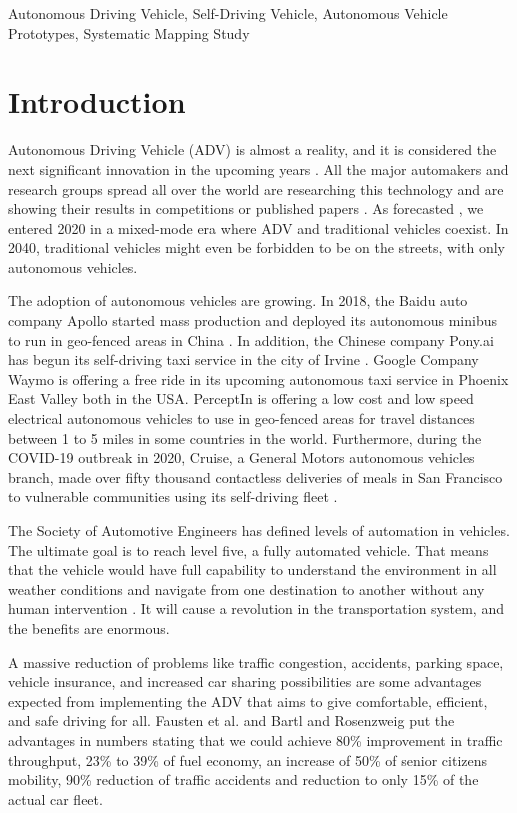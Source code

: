 \documentclass[lettersize,journal]{IEEEtran}
\begin{document}
\begin{IEEEkeywords}
Autonomous Driving Vehicle, Self-Driving Vehicle, Autonomous Vehicle Prototypes, Systematic Mapping Study
\end{IEEEkeywords}

\section{Introduction}
 Autonomous Driving  Vehicle (ADV) is almost a reality, and it is considered the next significant innovation in the upcoming years \cite{Rosenzweig2015}. All the major automakers and research groups spread all over the world are researching this technology and are showing their results in competitions or published papers \cite{Rosenzweig2015,Behere2015,Kato2015,Broggi2015}. As forecasted \cite{Liu2017c}, we entered 2020 in a mixed-mode era where ADV and traditional vehicles coexist. In 2040, traditional vehicles might even be forbidden to be on the streets, with only autonomous vehicles.

The adoption of autonomous vehicles are growing. In 2018, the Baidu auto company Apollo started mass production and deployed its autonomous minibus to run in geo-fenced areas in China \cite{Apollo}. In addition, the Chinese company Pony.ai has begun its self-driving taxi service in the city of Irvine \cite{Pony}. Google Company Waymo is offering a free ride in its upcoming autonomous taxi service in Phoenix East Valley  \cite{waymo} both in the USA. PerceptIn \cite{PerceptIn} is offering a low cost and low speed electrical autonomous vehicles to use in geo-fenced areas for travel distances between 1 to 5 miles in some countries in the world. Furthermore, during the COVID-19 outbreak in 2020, Cruise, a General Motors autonomous vehicles branch, made over fifty thousand contactless deliveries of meals in San Francisco to vulnerable communities using its self-driving fleet \cite{Cruise}. 

The Society of Automotive Engineers \cite{SAE} has defined levels of automation in vehicles. The ultimate goal is to reach level five, a fully automated vehicle. That means that the vehicle would have full capability to understand the environment in all weather conditions and navigate from one destination to another without any human intervention \cite{Lin2018}. It will cause a revolution in the transportation system, and the benefits are enormous. 

A massive reduction of problems like traffic congestion, accidents, parking space, vehicle insurance, and increased car sharing possibilities are some advantages expected from implementing the ADV \cite{Bimbraw2015} that aims to give comfortable, efficient, and safe driving for all. Fausten et al. \cite{Fausten2015} and Bartl and Rosenzweig \cite{Rosenzweig2015} put the advantages in numbers stating that we could achieve 80\% improvement in traffic throughput, 23\% to 39\% of fuel economy, an increase of 50\% of senior citizens mobility, 90\% reduction of traffic accidents and reduction to only 15\% of the actual car fleet.
\end{document}
